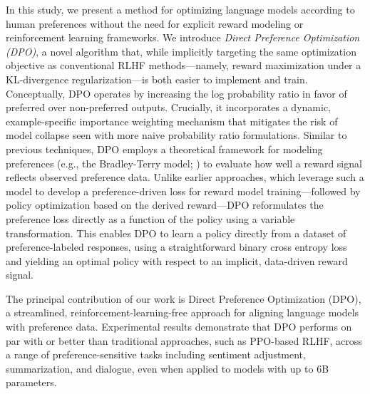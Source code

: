 In this study, we present a method for optimizing language models according to human preferences without the need for explicit reward modeling or reinforcement learning frameworks. We introduce \textit{{Direct Preference Optimization} (DPO)}, a novel algorithm that, while implicitly targeting the same optimization objective as conventional RLHF methods—namely, reward maximization under a KL-divergence regularization—is both easier to implement and train. Conceptually, DPO operates by increasing the log probability ratio in favor of preferred over non-preferred outputs. Crucially, it incorporates a dynamic, example-specific importance weighting mechanism that mitigates the risk of model collapse seen with more naive probability ratio formulations. Similar to previous techniques, DPO employs a theoretical framework for modeling preferences (e.g., the Bradley-Terry model; \cite{bradley1952rankanalysis}) to evaluate how well a reward signal reflects observed preference data. Unlike earlier approaches, which leverage such a model to develop a preference-driven loss for reward model training—followed by policy optimization based on the derived reward—DPO reformulates the preference loss directly as a function of the policy using a variable transformation. This enables DPO to learn a policy directly from a dataset of preference-labeled responses, using a straightforward binary cross entropy loss and yielding an optimal policy with respect to an implicit, data-driven reward signal.

The principal contribution of our work is Direct Preference Optimization (DPO), a streamlined, reinforcement-learning-free approach for aligning language models with preference data. Experimental results demonstrate that DPO performs on par with or better than traditional approaches, such as PPO-based RLHF, across a range of preference-sensitive tasks including sentiment adjustment, summarization, and dialogue, even when applied to models with up to 6B parameters.

